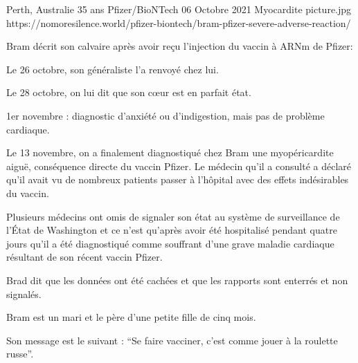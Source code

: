 {Perth, Australie}
{35 ans}
{Pfizer/BioNTech}
{06 Octobre 2021}
{Myocardite}
{picture.jpg}
{https://nomoresilence.world/pfizer-biontech/bram-pfizer-severe-adverse-reaction/}
{

Bram décrit son calvaire après avoir reçu l'injection du vaccin à ARNm de
Pfizer:

Le 26 octobre, son généraliste l'a renvoyé chez lui.

Le 28 octobre, on lui dit que son cœur est en parfait état.

1er novembre : diagnostic d'anxiété ou d'indigestion, mais pas de problème
cardiaque.

Le 13 novembre, on a finalement diagnostiqué chez Bram une myopéricardite aiguë,
conséquence directe du vaccin Pfizer. Le médecin qu'il a consulté a déclaré
qu'il avait vu de nombreux patients passer à l'hôpital avec des effets
indésirables du vaccin.

Plusieurs médecins ont omis de signaler son état au système de surveillance de
l'État de Washington et ce n'est qu'après avoir été hospitalisé pendant quatre
jours qu'il a été diagnostiqué comme souffrant d'une grave maladie cardiaque
résultant de son récent vaccin Pfizer.

Brad dit que les données ont été cachées et que les rapports sont enterrés et
non signalés.

Bram est un mari et le père d'une petite fille de cinq mois.

Son message est le suivant : “Se faire vacciner, c'est comme jouer à la roulette
russe”.

}
